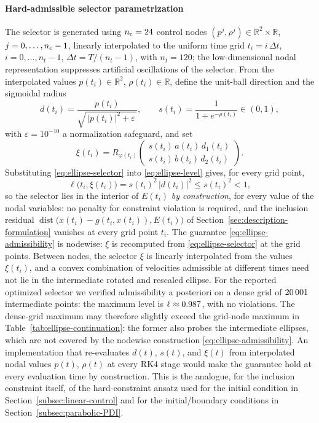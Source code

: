 \documentclass[11pt]{elsarticle}
\theoremstyle{definition}
\theoremstyle{remark}
\numberwithin{equation}{section}
\def\dist{\operatorname{dist}}
\begin{document}
\paragraph{Hard-admissible selector parametrization}
The selector is generated using $n_{\rm c}=24$ control nodes
$(p^j,\rho^j)\in\mathbb{R}^2\times\mathbb{R}$, $j=0,\dots,n_{\rm c}-1$,
linearly interpolated to the uniform time grid
$t_i=i\,\Delta t$, $i=0,\dots,n_t-1$, $\Delta t=T/(n_t-1)$, with
$n_t=120$; the low-dimensional nodal representation suppresses
artificial oscillations of the selector. From the interpolated values
$p(t_i)\in\mathbb{R}^2$, $\rho(t_i)\in\mathbb{R}$, define the unit-ball
direction and the sigmoidal radius
\begin{equation}
	\label{eq:ellipse-dir-radius}
	d(t_i)=\frac{p(t_i)}{\sqrt{\,|p(t_i)|^2+\varepsilon\,}},
	\qquad
	s(t_i)=\frac{1}{1+e^{-\rho(t_i)}}\in(0,1),
\end{equation}
with $\varepsilon=10^{-10}$ a normalization safeguard, and set
\begin{equation}
	\label{eq:ellipse-selector}
	\xi(t_i)
	=R_{\varphi(t_i)}
	\begin{pmatrix}
		s(t_i)\,a(t_i)\,d_1(t_i)\\
		s(t_i)\,b(t_i)\,d_2(t_i)
	\end{pmatrix}.
\end{equation}
Substituting \eqref{eq:ellipse-selector} into
\eqref{eq:ellipse-level} gives, for every grid point,
\begin{equation}
	\label{eq:ellipse-admissibility}
	\ell\bigl(t_i,\xi(t_i)\bigr)
	=s(t_i)^2\,|d(t_i)|^2
	\le s(t_i)^2<1,
\end{equation}
so the selector lies in the interior of $E(t_i)$ \emph{by construction},
for every value of the nodal variables: no penalty for constraint
violation is required, and the inclusion residual
$\dist\bigl(\dot x(t_i)-g(t_i,x(t_i)),E(t_i)\bigr)$ of
Section~\ref{sec:description-formulation} vanishes at every grid point
$t_i$. The guarantee \eqref{eq:ellipse-admissibility} is nodewise:
$\xi$ is recomputed from \eqref{eq:ellipse-selector} at the grid points.
Between nodes, the selector $\xi$ is linearly interpolated from the values
$\xi(t_i)$, and a convex combination of velocities admissible at different
times need not lie in the intermediate rotated and rescaled ellipse. For the reported optimized selector we
verified admissibility a posteriori on a dense grid of $20\,001$
intermediate points: the maximum level is $\ell\approx0.987$,
with no violations. The dense-grid maximum may therefore slightly exceed the grid-node maximum
in Table~\ref{tab:ellipse-continuation}: the former also probes the
intermediate ellipses, which are not covered by the nodewise construction
\eqref{eq:ellipse-admissibility}.
An implementation that re-evaluates $d(t)$, $s(t)$, and $\xi(t)$ from
interpolated nodal values $p(t)$, $\rho(t)$ at every RK4 stage would make
the guarantee hold at every evaluation time by construction. This is
the analogue, for the inclusion constraint itself, of the hard-constraint
ansatz used for the initial condition in
Section~\ref{subsec:linear-control} and for the initial/boundary
conditions in Section~\ref{subsec:parabolic-PDI}.
\end{document}
